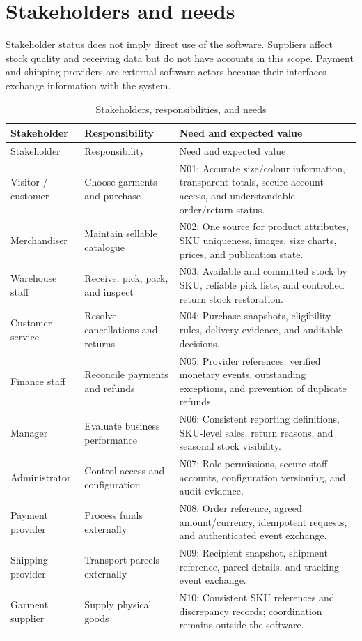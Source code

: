 \section{Stakeholders and needs}
Stakeholder status does not imply direct use of the software. Suppliers affect stock quality and receiving data but do not have accounts in this scope. Payment and shipping providers are external software actors because their interfaces exchange information with the system.
\begin{longtable}{P{.17\linewidth}P{.22\linewidth}P{.52\linewidth}}
\caption{Stakeholders, responsibilities, and needs}\label{tab:stakeholders}\\
\toprule Stakeholder & Responsibility & Need and expected value \\\midrule\endfirsthead
\toprule Stakeholder & Responsibility & Need and expected value \\\midrule\endhead
Visitor / customer & Choose garments and purchase & N01: Accurate size/colour information, transparent totals, secure account access, and understandable order/return status.\\
Merchandiser & Maintain sellable catalogue & N02: One source for product attributes, SKU uniqueness, images, size charts, prices, and publication state.\\
Warehouse staff & Receive, pick, pack, and inspect & N03: Available and committed stock by SKU, reliable pick lists, and controlled return stock restoration.\\
Customer service & Resolve cancellations and returns & N04: Purchase snapshots, eligibility rules, delivery evidence, and auditable decisions.\\
Finance staff & Reconcile payments and refunds & N05: Provider references, verified monetary events, outstanding exceptions, and prevention of duplicate refunds.\\
Manager & Evaluate business performance & N06: Consistent reporting definitions, SKU-level sales, return reasons, and seasonal stock visibility.\\
Administrator & Control access and configuration & N07: Role permissions, secure staff accounts, configuration versioning, and audit evidence.\\
Payment provider & Process funds externally & N08: Order reference, agreed amount/currency, idempotent requests, and authenticated event exchange.\\
Shipping provider & Transport parcels externally & N09: Recipient snapshot, shipment reference, parcel details, and tracking event exchange.\\
Garment supplier & Supply physical goods & N10: Consistent SKU references and discrepancy records; coordination remains outside the software.\\
\bottomrule
\end{longtable}

